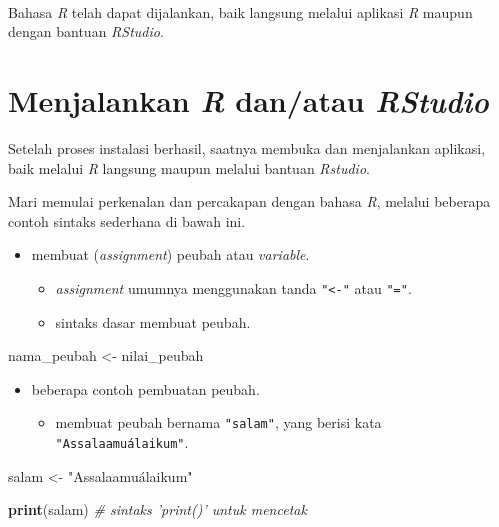 \documentclass[
  12pt,
  a4paper,
]{scrbook}
\newenvironment{Shaded}{\begin{snugshade}}{\end{snugshade}}
\newcommand{\CommentTok}[1]{\textcolor[rgb]{0.56,0.35,0.01}{\textit{#1}}}
\newcommand{\KeywordTok}[1]{\textcolor[rgb]{0.13,0.29,0.53}{\textbf{#1}}}
\newcommand{\NormalTok}[1]{#1}
\newcommand{\StringTok}[1]{\textcolor[rgb]{0.31,0.60,0.02}{#1}}
\providecommand{\tightlist}{%
  \setlength{\itemsep}{0pt}\setlength{\parskip}{0pt}}
\begin{document}
~

Bahasa \emph{R} telah dapat dijalankan, baik langsung melalui aplikasi
\emph{R} maupun dengan bantuan \emph{RStudio}.

\hypertarget{jalankanr}{%
\section{\texorpdfstring{Menjalankan \emph{R} dan/atau
\emph{RStudio}}{Menjalankan R dan/atau RStudio}}\label{jalankanr}}

Setelah proses instalasi berhasil, saatnya membuka dan menjalankan
aplikasi, baik melalui \emph{R} langsung maupun melalui bantuan
\emph{Rstudio}.

Mari memulai perkenalan dan percakapan dengan bahasa \emph{R}, melalui
beberapa contoh sintaks sederhana di bawah ini.

\begin{itemize}
\tightlist
\item
  membuat (\emph{assignment}) peubah atau \emph{variable}.

  \begin{itemize}
  \tightlist
  \item
    \emph{assignment} umumnya menggunakan tanda \texttt{"\textless{}-"}
    atau \texttt{"="}.
  \item
    sintaks dasar membuat peubah.
  \end{itemize}
\end{itemize}

\begin{Shaded}
\begin{Highlighting}[]
\NormalTok{nama_peubah <-}\StringTok{ }\NormalTok{nilai_peubah}
\end{Highlighting}
\end{Shaded}

\begin{itemize}
\tightlist
\item
  beberapa contoh pembuatan peubah.

  \begin{itemize}
  \tightlist
  \item
    membuat peubah bernama \texttt{"salam"}, yang berisi kata
    \texttt{"Assalaamuálaikum"}.
  \end{itemize}
\end{itemize}

\begin{Shaded}
\begin{Highlighting}[]
\NormalTok{salam <-}\StringTok{ "Assalaamuálaikum"}

\KeywordTok{print}\NormalTok{(salam)  }\CommentTok{# sintaks 'print()' untuk mencetak}
\end{Highlighting}
\end{Shaded}
\end{document}
